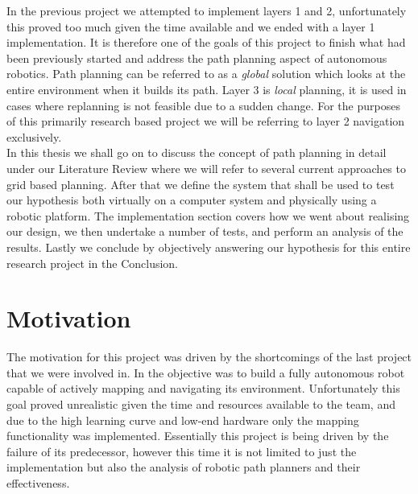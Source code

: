 \noindent
In the previous project we attempted to implement layers 1 and 2, unfortunately this proved too much given the time available and we ended with a layer 1 implementation. It is therefore one of the goals of this project to finish what had been previously started and address the path planning aspect of autonomous robotics. Path planning can be referred to as a \textit{global} solution which looks at the entire environment when it builds its path. Layer 3 is \textit{local} planning, it is used in cases where replanning is not feasible due to a sudden change. For the purposes of this primarily research based project we will be referring to layer 2 navigation exclusively. \\

\noindent
In this thesis we shall go on to discuss the concept of path planning in detail under our Literature Review where we will refer to several current approaches to grid based planning. After that we define the system that shall be used to test our hypothesis both virtually on a computer system and physically using a robotic platform. The implementation section covers how we went about realising our design, we then undertake a number of tests, and perform an analysis of the results. Lastly we conclude by objectively answering our hypothesis for this entire research project in the Conclusion. 

\newpage


\section{Motivation}

\noindent
The motivation for this project was driven by the shortcomings of the last project \cite{JMD14} that we were involved in. In \cite{JMD14} the objective was to build a fully autonomous robot capable of actively mapping and navigating its environment. Unfortunately this goal proved unrealistic given the time and resources available to the team, and due to the high learning curve and low-end hardware only the mapping functionality was implemented. Essentially this project is being driven by the failure of its predecessor, however this time it is not limited to just the implementation but also the analysis of robotic path planners and their effectiveness.

